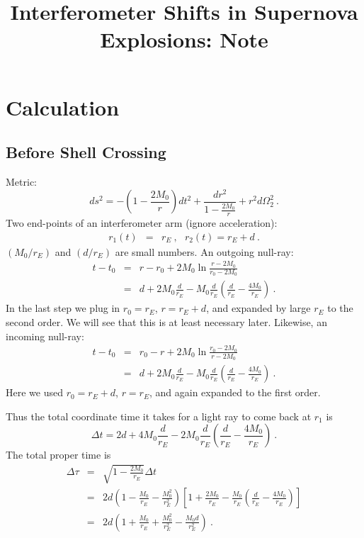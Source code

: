 \documentclass[12pt,letterpaper]{JHEP3}
\title{Interferometer Shifts in Supernova Explosions: Note}
\author{
}
\begin{document}
\section{Calculation}

\subsection{Before Shell Crossing}

Metric:
\begin{equation}
ds^2 = -\left(1-\frac{2M_{0}}{r}\right)dt^2 + \frac{dr^2}{1-\frac{2M_{0}}{r}}+r^2d\Omega_2^2~.
\end{equation}
Two end-points of an interferometer arm (ignore acceleration):
\begin{eqnarray}
r_1(t) &=& r_{E}~, \ \ \ r_2(t) = r_{E}+d~.
\end{eqnarray}
$(M_{0}/r_E)$ and $(d/r_E)$ are small numbers. An outgoing null-ray:
\begin{eqnarray}
t-t_0 &=& r-r_0 + 2M_{0}\ln\frac{r-2M_{0}}{r_0-2M_{0}} \\ \nonumber
&=& d + 2M_{0}\frac{d}{r_E} -M_{0}\frac{d}{r_E}
\left( \frac{d}{r_E}-\frac{4M_{0}}{r_E} \right)~.
\label{eq-dt1}
\end{eqnarray}
In the last step we plug in $r_0=r_E$, $r = r_E+d$, and expanded by large $r_E$ to the second order. We will see that this is at least necessary later. Likewise, an incoming null-ray:
\begin{eqnarray}
t-t_0 &=& r_0-r + 2M_{0}\ln\frac{r_0-2M_{0}}{r-2M_{0}} \\ \nonumber
&=& d + 2M_{0}\frac{d}{r_E} - M_{0}\frac{d}{r_E}
\left( \frac{d}{r_E}-\frac{4M_{0}}{r_E} \right) ~.
\end{eqnarray}
Here we used $r_0 = r_E+d$, $r = r_E$, and again expanded to the first order.

Thus the total coordinate time it takes for a light ray to come back at $r_1$ is
\begin{equation}
\Delta t = 2d + 4M_{0}\frac{d}{r_E} - 2M_{0}\frac{d}{r_E}
\left( \frac{d}{r_E}-\frac{4M_{0}}{r_E} \right)~.
\end{equation}
The total proper time is
\begin{eqnarray}
\Delta \tau &=& \sqrt{1-\frac{2M_{0}}{r_E}}\Delta t  \\ \nonumber
&=& 2d \left(1-\frac{M_{0}}{r_E} - \frac{M_{0}^2}{r_E^2}\right) 
\left[ 1+\frac{2M_{0}}{r_E} - \frac{M_{0}}{r_E}\left( \frac{d}{r_E} - \frac{4M_{0}}{r_E} \right) \right] \\ \nonumber
&=& 2d
\left(1 + \frac{M_{0}}{r_E} + \frac{M_{0}^2}{r_E^2} - \frac{M_{0}d}{r_E^2}\right)~.
\end{eqnarray}
\end{document}
